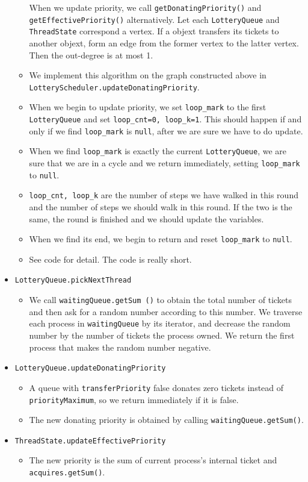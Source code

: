 \documentclass{article}
\begin{document}
\begin{itemize}
\begin{itemize}
	When we update priority, we call \texttt{getDonatingPriority()} and \texttt{getEffectivePriority()} alternatively.
	Let each \texttt{LotteryQueue} and \texttt{ThreadState} correspond a vertex.
	If a objext transfers its tickets to another objext, form an edge from the former vertex to the latter vertex.
	Then the out-degree is at most 1.
	\item
	We implement this algorithm on the graph constructed above in \texttt{LotteryScheduler.updateDonatingPriority}.
	\item
	When we begin to update priority, we set \texttt{loop\_mark} to the first \texttt{LotteryQueue} and set \texttt{loop\_cnt=0, loop\_k=1}.
	This should happen if and only if we find \texttt{loop\_mark} is \texttt{null}, after we are sure we have to do update.
	\item
	When we find \texttt{loop\_mark} is exactly the current \texttt{LotteryQueue}, we are sure that we are in a cycle and we return immediately, setting \texttt{loop\_mark} to \texttt{null}.
	\item
	\texttt{loop\_cnt, loop\_k} are the number of steps we have walked in this round and the number of steps we should walk in this round.
	If the two is the same, the round is finished and we should update the variables.
	\item
	When we find its end, we begin to return and reset \texttt{loop\_mark} to \texttt{null}.
	\item
	See code for detail. The code is really short.
	\end{itemize}
\item
\texttt{LotteryQueue.pickNextThread}
	\begin{itemize}
	\item
	We call \texttt{waitingQueue.getSum ()} to obtain the total number of tickets and then ask for a random number according to this number.
	We traverse each process in \texttt{waitingQueue} by its iterator, and decrease the random number by the number of tickets the process owned.
	We return the first process that makes the random number negative.
	\end{itemize}
\item
\texttt{LotteryQueue.updateDonatingPriority}
	\begin{itemize}
	\item
	A queue with \texttt{transferPriority} false donates zero tickets instead of \texttt{priorityMaximum}, so we return immediately if it is false.
	\item
	The new donating priority is obtained by calling \texttt{waitingQueue.getSum()}.
	\end{itemize}
\item
\texttt{ThreadState.updateEffectivePriority}
	\begin{itemize}
	\item
	The new priority is the sum of current process's internal ticket and \texttt{acquires.getSum()}.
	\end{itemize}
\end{itemize}
\end{document}
